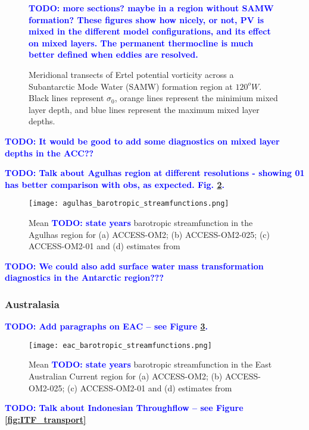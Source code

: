 \documentclass[gmd, manuscript]{copernicus}
\newcommand{\TODO}[1]{\textcolor{blue}{\textsf{\textbf{TODO: #1}}}}
\begin{document}
\begin{figure}[t]
\caption{Meridional transects of Ertel potential vorticity across a Subantarctic Mode Water (SAMW) formation region at $120^oW$. Black lines represent $\sigma_0$, orange lines represent the minimium mixed layer depth, and blue lines represent the maximum mixed layer depths.} 
\TODO{more sections? maybe in a region without SAMW formation? These figures show how nicely, or not, PV is mixed in the different model configurations, and its effect on mixed layers. The permanent thermocline is much better defined when eddies are resolved.}
\label{fig:SR3}
\end{figure}

\TODO{It would be good to add some diagnostics on mixed layer depths in the ACC??}

\TODO{Talk about Agulhas region at different resolutions - showing 01 has better comparison with obs, as expected. Fig. \ref{fig:agulhas}.}
\begin{figure}[t]
\texttt{[image: agulhas\_barotropic\_streamfunctions.png]}
\caption{Mean \TODO{state years} barotropic streamfunction in the Agulhas region for (a)  ACCESS-OM2; (b) ACCESS-OM2-025; (c) ACCESS-OM2-01 and (d) estimates from \citet{cdvo:2016}
\label{fig:agulhas}}
\end{figure}




\TODO{We could also add surface water mass transformation diagnostics in the Antarctic region???}
\subsubsection{Australasia}

\TODO{Add paragraphs on EAC -- see Figure \ref{fig:EAC}. }

\begin{figure}[t]
\texttt{[image: eac\_barotropic\_streamfunctions.png]}
\caption{Mean \TODO{state years} barotropic streamfunction in the East Australian Current region for (a)  ACCESS-OM2; (b) ACCESS-OM2-025; (c) ACCESS-OM2-01 and (d) estimates from \citet{cdvo:2016}  \label{fig:EAC}}
\end{figure}

\TODO{Talk about Indonesian Throughflow -- see Figure \ref{fig:ITF_transport}}
\end{document}

